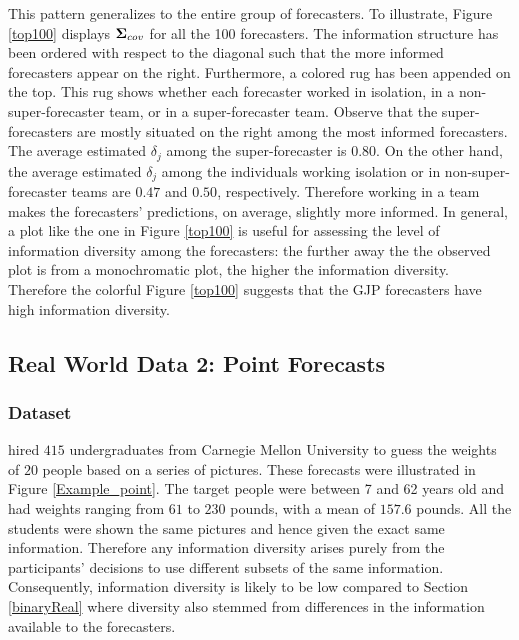 \documentclass[11pt]{article}
\theoremstyle{definition}
\theoremstyle{definition}
\def\bSigma{{\bf \Sigma}}
\begin{document}
This pattern generalizes to the entire group of forecasters. To illustrate, Figure  \ref{top100} displays $\bSigma_{cov}$ for all the 100 forecasters. The information structure has been ordered with respect to the diagonal such that the more informed forecasters appear on the right. Furthermore, a colored rug has been appended on the top. This rug shows whether each forecaster worked in isolation, in a non-super-forecaster team, or in a super-forecaster team. Observe that the super-forecasters are mostly situated on the right among the most informed forecasters. The average estimated $\delta_j$ among the super-forecaster is $0.80$.  On the other hand, the average estimated $\delta_j$ among the individuals working isolation or in non-super-forecaster teams are $0.47$ and $0.50$, respectively. Therefore working in a team makes the forecasters' predictions, on average, slightly more informed. In general, a plot like the one in Figure  \ref{top100} is useful for assessing the level of information diversity among the forecasters: the further away the the observed plot is from a monochromatic plot, the higher the information diversity. Therefore the colorful Figure  \ref{top100} suggests that the GJP forecasters have high information diversity. 




\subsection{Real World Data 2: Point Forecasts}
\label{continuousReal}
\subsubsection{Dataset}
\citet{moore2008use} hired $415$ undergraduates from Carnegie Mellon University to guess the weights of $20$ people based on a series of pictures. These forecasts were illustrated in Figure \ref{Example_point}. The target people were between 7 and 62 years old and had weights ranging from $61$ to $230$ pounds, with a mean of $157.6$ pounds. All the students were shown the same pictures and hence given the exact same information. 
Therefore any information diversity arises purely from the participants' decisions to use different subsets of the same information. 
Consequently, information diversity is likely to be low compared to Section \ref{binaryReal} where diversity also stemmed from differences in the information available to the forecasters.
\end{document}
